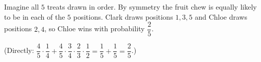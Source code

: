 Imagine all $5$ treats drawn in order. By symmetry the fruit chew is equally likely to be in each of the $5$ positions. Clark draws positions $1,3,5$ and Chloe draws positions $2,4$, so Chloe wins with probability $\boxed{\dfrac{2}{5}}$.

(Directly: $\dfrac{4}{5}\cdot\dfrac{1}{4}+\dfrac{4}{5}\cdot\dfrac{3}{4}\cdot\dfrac{2}{3}\cdot\dfrac{1}{2}=\dfrac{1}{5}+\dfrac{1}{5}=\dfrac{2}{5}$.)
